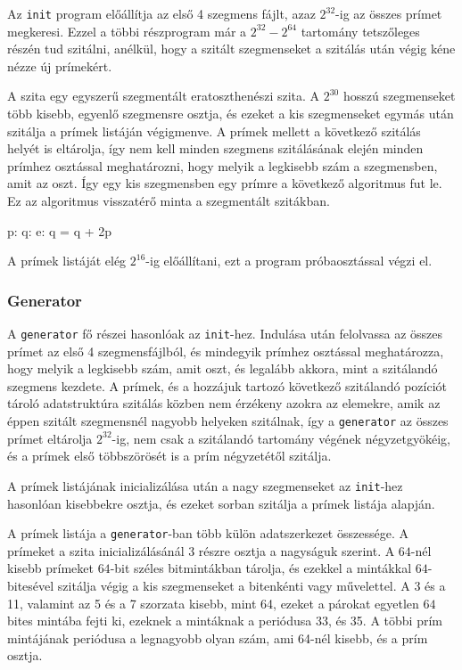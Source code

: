 Az \texttt{init} program előállítja az első 4 szegmens fájlt, azaz $2^{32}$-ig az összes prímet megkeresi.
Ezzel a többi részprogram már a $2^{32} - 2^{64}$ tartomány tetszőleges részén tud szitálni, anélkül, hogy a szitált szegmenseket a szitálás után végig kéne nézze új prímekért.

A szita egy egyszerű szegmentált eratoszthenészi szita.
A $2^{30}$ hosszú szegmenseket több kisebb, egyenlő szegmensre osztja, és ezeket a kis szegmenseket
egymás után szitálja a prímek listáján végigmenve.
A prímek mellett a következő szitálás helyét is eltárolja, így nem kell minden szegmens szitálásának elején minden prímhez osztással meghatározni, hogy melyik a legkisebb szám a szegmensben, amit az oszt.
Így egy kis szegmensben egy prímre a következő algoritmus fut le.
Ez az algoritmus visszatérő minta a szegmentált szitákban.

\begin{algorithmic}[1]
\State p: 
\State q: 
\State e: 
	\State {}
	\State q = q + 2p
\EndWhile
\end{algorithmic}

A prímek listáját elég $2^{16}$-ig előállítani, ezt a program próbaosztással végzi el.

\subsubsection{Generator}

A \texttt{generator} fő részei hasonlóak az \texttt{init}-hez.
Indulása után felolvassa az összes prímet az első 4 szegmensfájlból, és mindegyik prímhez osztással meghatározza, hogy melyik a legkisebb szám, amit oszt, és legalább akkora, mint a szitálandó szegmens kezdete.
A prímek, és a hozzájuk tartozó következő szitálandó pozíciót tároló adatstruktúra szitálás közben nem érzékeny azokra az elemekre, amik az éppen szitált szegmensnél nagyobb helyeken szitálnak, így a \texttt{generator} az összes prímet eltárolja $2^{32}$-ig, nem csak a szitálandó tartomány végének négyzetgyökéig, és a prímek első többszörösét is a prím négyzetétől szitálja.

A prímek listájának inicializálása után a nagy szegmenseket az \texttt{init}-hez hasonlóan kisebbekre osztja, és ezeket sorban szitálja a prímek listája alapján.

A prímek listája a \texttt{generator}-ban több külön adatszerkezet összessége.
A prímeket a szita inicializálásánál 3 részre osztja a nagyságuk szerint.
A $64$-nél kisebb prímeket $64$-bit széles bitmintákban tárolja, és ezekkel a mintákkal $64$-bitesével szitálja végig a kis szegmenseket a bitenkénti vagy művelettel.
A 3 és a 11, valamint az 5 és a 7 szorzata kisebb, mint 64, ezeket a párokat egyetlen $64$ bites mintába fejti ki, ezeknek a mintáknak a periódusa 33, és 35.
A többi prím mintájának periódusa a legnagyobb olyan szám, ami 64-nél kisebb, és a prím osztja.

